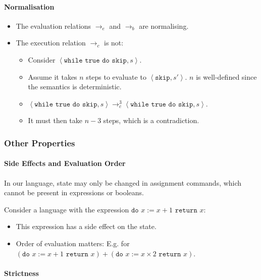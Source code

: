 \documentclass[twocolumn,english]{article}
\begin{document}
\paragraph{Normalisation}
\begin{itemize}
\item The evaluation relations $\rightarrow_{e}$ and $\rightarrow_{b}$
are normalising. 
\item The execution relation $\rightarrow_{c}$ is not: 

\begin{itemize}
\item Consider $\left\langle \texttt{while true do skip},s\right\rangle $. 
\item Assume it takes $n$ steps to evaluate to $\left\langle \texttt{skip},s'\right\rangle $.
$n$ is well-defined since the semantics is deterministic. 
\item $\left\langle \texttt{while true do skip},s\right\rangle \rightarrow_{c}^{3}\left\langle \texttt{while true do skip},s\right\rangle $. 
\item It must then take $n-3$ steps, which is a contradiction. 
\end{itemize}
\end{itemize}

\subsubsection{Other Properties}


\paragraph{Side Effects and Evaluation Order}

In our language, state may only be changed in assignment commands,
which cannot be present in expressions or booleans.

Consider a language with the expression \texttt{$\texttt{do }x:=x+1\texttt{ return }x$}: 
\begin{itemize}
\item This expression has a side effect on the state. 
\item Order of evaluation matters: E.g. for $(\texttt{do }x:=x+1\texttt{ return }x)+(\texttt{do }x:=x\times2\texttt{ return }x)$. 
\end{itemize}

\paragraph{Strictness}
\end{document}
